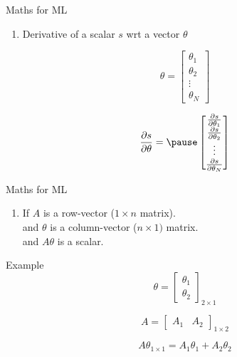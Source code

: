\documentclass{beamer}
\newcounter{saveenumi}
\newcommand{\seti}{\setcounter{saveenumi}{\value{enumi}}}
\newcommand{\conti}{\setcounter{enumi}{\value{saveenumi}}}
\begin{document}
\begin{frame}{Maths for ML}

\begin{enumerate}
	\conti
	\item Derivative of a scalar $s$ wrt a vector $\theta$
	\seti
\end{enumerate}
 
    $$
        \theta = \begin{bmatrix}
  \theta_{1}\\
  \theta_{2}\\
  \vdots\\
  \theta_{N}
    \end{bmatrix}   
  $$
  


   
 
  $$
        \frac{\partial s}{\partial \theta} =\pause  \begin{bmatrix}
  \frac{\partial s}{\partial \theta_{1}}\\
  \frac{\partial s}{\partial \theta_{2}}\\
    \vdots\\
  \frac{\partial s}{\partial \theta_{N}}\\
    \end{bmatrix}
 $$
      
   
    

\end{frame}


\begin{frame}{Maths for ML}\
\begin{enumerate}
	\conti
	\item   If $A$ is a row-vector ($1\times  n $ matrix).\\
	and $\theta$ is a column-vector ($n \times 1)$ matrix.\\
	and $A\theta$ is a scalar.\\
	\seti
\end{enumerate}

  Example
  \begin{equation*}
      \theta = \begin{bmatrix}
      \theta_{1}\\
      \theta_{2}
      \end{bmatrix}_{2\times 1}
  \end{equation*}
  
    \begin{equation*}
      A = \begin{bmatrix}
      A_{1}& A_{2}
      \end{bmatrix}_{1 \times 2}
  \end{equation*}
  
    \begin{equation*}
      A\theta_{1 \times 1} = 
      A_{1}\theta_{1}+A_{2}\theta_{2}
       \end{equation*}
  
\end{frame}
\end{document}
